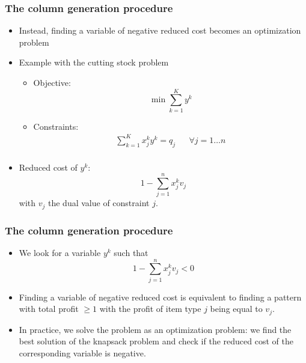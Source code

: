 \documentclass[10pt]{beamer}
\begin{document}
\begin{frame}
  \frametitle{The column generation procedure}
  \begin{itemize}
    \item Instead, finding a variable of negative reduced cost becomes an optimization problem

    \item Example with the cutting stock problem
      \begin{itemize}
        \item Objective:
          \begin{displaymath}
            \min \sum_{k = 1}^{K} y^k
          \end{displaymath}

        \item Constraints:
          \begin{align*}
            \sum_{k = 1}^{K} x_j^k y^k = q_j && \forall j = 1 \dots n \\
          \end{align*}
      \end{itemize}

    \item Reduced cost of $y^k$:
      \begin{displaymath}
        1 - \sum_{j = 1}^n x_j^k v_j
      \end{displaymath}
      with $v_j$ the dual value of constraint $j$.
  \end{itemize}
\end{frame}

\begin{frame}
  \frametitle{The column generation procedure}
  
  \begin{itemize}
    \item We look for a variable $y^k$ such that
      \begin{displaymath}
        1 - \sum_{j = 1}^n x_j^k v_j < 0
      \end{displaymath}
    
    \item Finding a variable of negative reduced cost is equivalent to finding a pattern with total profit $\ge 1$ with the profit of item type $j$ being equal to $v_j$.

    \item In practice, we solve the problem as an optimization problem: we find the best solution of the knapsack problem and check if the reduced cost of the corresponding variable is negative.
  \end{itemize}

\end{frame}
\end{document}
